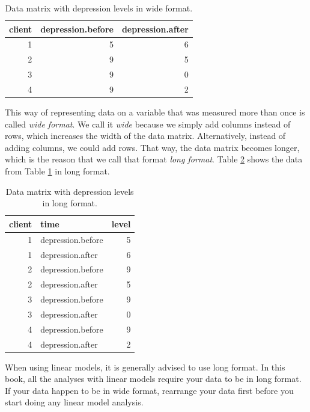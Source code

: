 \documentclass[]{report}\usepackage[]{graphicx}\usepackage[]{color}
\begin{document}
\begin{table}[ht]
\centering
\caption{Data matrix with depression levels in wide format.} 
\label{tab:data_7}
\begin{tabular}{rrr}
  \hline
client & depression.before & depression.after \\ 
  \hline
1 & 5 & 6 \\ 
  2 & 9 & 5 \\ 
  3 & 9 & 0 \\ 
  4 & 9 & 2 \\ 
   \hline
\end{tabular}
\end{table}


This way of representing data on a variable that was measured more than once is called \textit{wide format}. We call it \textit{wide} because we simply add columns instead of rows, which increases the width of the data matrix. Alternatively, instead of adding columns, we could add rows. That way, the data matrix becomes longer, which is the reason that we call that format \textit{long format}. Table \ref{tab:data_8} shows the data from Table \ref{tab:data_7} in long format.

\begin{table}[ht]
\centering
\caption{Data matrix with depression levels in long format.} 
\label{tab:data_8}
\begin{tabular}{rlr}
  \hline
client & time & level \\ 
  \hline
1 & depression.before & 5 \\ 
  1 & depression.after & 6 \\ 
  2 & depression.before & 9 \\ 
  2 & depression.after & 5 \\ 
  3 & depression.before & 9 \\ 
  3 & depression.after & 0 \\ 
  4 & depression.before & 9 \\ 
  4 & depression.after & 2 \\ 
   \hline
\end{tabular}
\end{table}


When using linear models, it is generally advised to use long format. In this book, all the analyses with linear models require your data to be in long format. If your data happen to be in wide format, rearrange your data first before you start doing any linear model analysis. 
\end{document}
